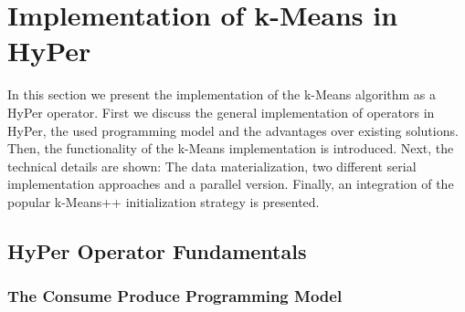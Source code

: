\chapter{Implementation of k-Means in HyPer}\label{chapter:implementation}

In this section we present the implementation of the k-Means algorithm as a HyPer operator. First we discuss the general implementation of operators in HyPer, the used programming model and the advantages over existing solutions. Then, the functionality of the k-Means implementation is introduced. Next, the technical details are shown: The data materialization, two different serial implementation approaches and a parallel version. Finally, an integration of the popular k-Means++ initialization strategy is presented.


\section{HyPer Operator Fundamentals}
\subsection{The Consume Produce Programming Model}


